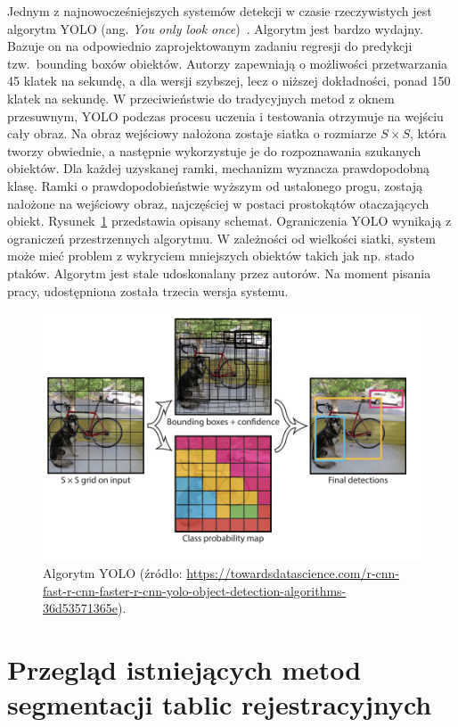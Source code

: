 Jednym z najnowocześniejszych systemów detekcji w czasie rzeczywistych jest algorytm YOLO (ang. \textit{You only look once})~\cite{7780460}.
Algorytm jest bardzo wydajny.
Bazuje on na odpowiednio zaprojektowanym zadaniu regresji do predykcji tzw.\ bounding boxów obiektów.
Autorzy zapewniają o możliwości przetwarzania 45 klatek na sekundę, a dla wersji szybszej, lecz o niższej dokładności, ponad 150 klatek na sekundę.
W przeciwieństwie do tradycyjnych metod z oknem przesuwnym, YOLO podczas procesu uczenia i testowania otrzymuje na wejściu cały obraz.
Na obraz wejściowy nałożona zostaje siatka o rozmiarze $S\times S$, która tworzy obwiednie, a następnie wykorzystuje je do rozpoznawania szukanych obiektów.
Dla każdej uzyskanej ramki, mechanizm wyznacza prawdopodobną klasę.
Ramki o prawdopodobieństwie wyższym od ustalonego progu, zostają nałożone na wejściowy obraz, najczęściej w postaci prostokątów otaczających obiekt.
Rysunek~\ref{fig:yolo} przedstawia opisany schemat.
Ograniczenia YOLO wynikają z ograniczeń przestrzennych algorytmu.
W zależności od wielkości siatki, system może mieć problem z wykryciem mniejszych obiektów takich jak np. stado ptaków.
Algorytm jest stale udoskonalany przez autorów.
Na moment pisania pracy, udostępniona została trzecia wersja systemu.
\begin{figure}[!ht]
    \centering
    \includegraphics[scale=0.4]{Pictures/yolo}
    \caption{Algorytm YOLO (źródło: \url{https://towardsdatascience.com/r-cnn-fast-r-cnn-faster-r-cnn-yolo-object-detection-algorithms-36d53571365e}).}
    \label{fig:yolo}
\end{figure}
\FloatBarrier


\section{Przegląd istniejących metod segmentacji tablic rejestracyjnych}

